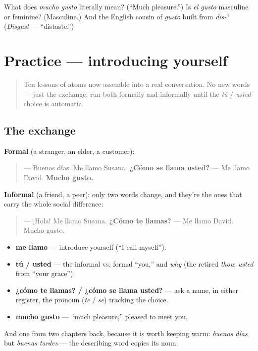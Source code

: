\begin{tcolorbox}[breakable,colback=teal!4,colframe=teal!35!black,title={Before you move on}]
What does \emph{mucho gusto} literally mean? (\textquotedblleft{}Much pleasure.\textquotedblright{}) Is \emph{el gusto} masculine or feminine? (Masculine.) And the English cousin of \emph{gusto} built from \emph{dis-}? (\emph{Disgust} — \textquotedblleft{}distaste.\textquotedblright{})
\end{tcolorbox}
\section[Practice]{Practice — introducing yourself}

\label{lesson:ES-C03-practice}



\begin{quote}
Ten lessons of atoms now assemble into a real conversation. No new words — just the exchange, run both formally and informally until the \emph{tú} / \emph{usted} choice is automatic.
\end{quote}

\subsection*{The exchange}
\textbf{Formal} (a stranger, an elder, a customer):

\begin{quote}
— Buenos días. Me llamo Susana. \textbf{¿Cómo se llama usted?} — Me llamo David. \textbf{Mucho gusto.}
\end{quote}

\textbf{Informal} (a friend, a peer): only two words change, and they're the ones that carry the whole social difference:

\begin{quote}
— ¡Hola! Me llamo Susana. \textbf{¿Cómo te llamas?} — Me llamo David. Mucho gusto.
\end{quote}

\begin{grammarlens}[title={What you've built}]
\begin{itemize}
\raggedright
  \item \textbf{me llamo} — introduce yourself (\textquotedblleft{}I call myself\textquotedblright{}).
  \item \textbf{tú / usted} — the informal vs. formal \textquotedblleft{}you,\textquotedblright{} and \emph{why} (the retired \emph{thou}; \emph{usted} from \textquotedblleft{}your grace\textquotedblright{}).
  \item \textbf{¿cómo te llamas? / ¿cómo se llama usted?} — ask a name, in either register, the pronoun (\emph{te} / \emph{se}) tracking the choice.
  \item \textbf{mucho gusto} — \textquotedblleft{}much pleasure,\textquotedblright{} pleased to meet you.
\end{itemize}

And one from two chapters back, because it is worth keeping warm: \emph{buenos días} but \emph{buenas tardes} — the describing word copies its noun.
\end{grammarlens}

